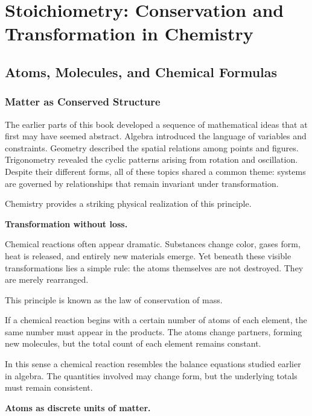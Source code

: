 \documentclass[11pt, openany]{book}
\theoremstyle{plain}
\theoremstyle{definition}
\theoremstyle{remark}
\begin{document}
\part{Stoichiometry: Conservation and Transformation in Chemistry}

\chapter{Atoms, Molecules, and Chemical Formulas}

\section*{Matter as Conserved Structure}

The earlier parts of this book developed a sequence of mathematical ideas
that at first may have seemed abstract. Algebra introduced the language
of variables and constraints. Geometry described the spatial relations
among points and figures. Trigonometry revealed the cyclic patterns
arising from rotation and oscillation. Despite their different forms,
all of these topics shared a common theme: systems are governed by
relationships that remain invariant under transformation.

Chemistry provides a striking physical realization of this principle.

\medskip

\textbf{Transformation without loss.}

Chemical reactions often appear dramatic. Substances change color, gases
form, heat is released, and entirely new materials emerge. Yet beneath
these visible transformations lies a simple rule: the atoms themselves
are not destroyed. They are merely rearranged.

This principle is known as the law of conservation of mass.

If a chemical reaction begins with a certain number of atoms of each
element, the same number must appear in the products. The atoms change
partners, forming new molecules, but the total count of each element
remains constant.

In this sense a chemical reaction resembles the balance equations
studied earlier in algebra. The quantities involved may change form, but
the underlying totals must remain consistent.

\medskip

\textbf{Atoms as discrete units of matter.}
\end{document}
